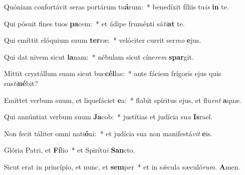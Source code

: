 \item Quóniam confortávit seras portárum tu\textbf{á}rum:~* benedíxit fíliis tu\tinyhspace\textit{is} \textbf{in} te.
\item Qui pósuit fines tuos \textbf{pa}cem:~* et ádipe fruménti sá\tinyhspace\textit{ti}\textbf{at} te.
\item Qui emíttit elóquium suum \textbf{ter}ræ:~* velóciter currit ser\textit{mo} \textbf{e}jus.
\item Qui dat nivem sicut \textbf{la}nam:~* nébulam sicut cíne\tinyhspace\textit{rem} \textbf{spar}git.
\item Mittit crystállum suam sicut buc\textbf{cél}las:~* ante fáciem frígoris ejus quis sus\tinyhspace\textit{ti}\textbf{né}bit?
\item Emíttet verbum suum, et liquefáciet \textbf{e}a:~* flabit spíritus ejus, et flu\tinyhspace\textit{ent} \textbf{a}quæ.
\item Qui annúntiat verbum suum \textbf{Ja}cob:~* justítias et judícia su\tinyhspace\textit{a} \textbf{Is}rael.
\item Non fecit táliter omni nati\textbf{ó}ni:~* et judícia sua non manifestá\tinyhspace\textit{vit} \textbf{e}is.
\item Glória Patri, et \textbf{Fí}lio~* et Spirítu\tinyhspace\textit{i} \textbf{San}cto.
\item Sicut erat in princípio, et nunc, et \textbf{sem}per~* et in sǽcula sæculó\textit{rum.} \textbf{A}men.
